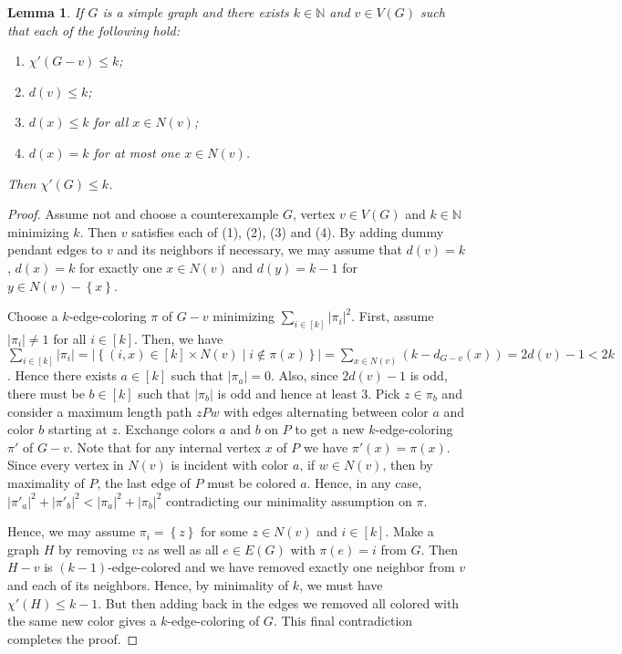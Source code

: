 \documentclass[12pt]{article}
\theoremstyle{plain}
\newtheorem{lem}[thm]{Lemma}
\theoremstyle{definition}
\theoremstyle{remark}
\newcommand{\set}[1]{\left\{ #1 \right\}}
\newcommand{\setb}[3]{\left\{ #1 \in #2 \mid #3 \right\}}
\newcommand{\card}[1]{\left|#1\right|}
\newcommand{\irange}[1]{\left[#1\right]}
\begin{document}
\begin{lem}\label{SimpleVizPrecursor}
If $G$ is a simple graph and there exists $k \in \mathbb{N}$ and $v \in V(G)$ such that each of the following hold:
\begin{enumerate}
\item $\chi'(G - v) \leq k$;
\item $d(v) \leq k$;
\item $d(x) \leq k$ for all $x \in N(v)$;
\item $d(x) = k$ for at most one $x \in N(v)$.
\end{enumerate}
Then $\chi'(G) \leq k$.
\end{lem}
\begin{proof}
Assume not and choose a counterexample $G$, vertex $v \in V(G)$ and $k \in \mathbb{N}$ minimizing $k$.  Then $v$ satisfies each of (1), (2), (3) and (4).  By adding dummy pendant edges to $v$ and its neighbors if necessary, we may assume that $d(v) = k$, $d(x) = k$ for exactly one $x \in N(v)$ and $d(y) = k - 1$ for $y \in N(v) - \set{x}$.

Choose a $k$-edge-coloring $\pi$ of $G - v$ minimizing $\sum_{i \in \irange{k}} \card{\pi_i}^2$.  First, assume $\card{\pi_i} \neq 1$ for all $i \in \irange{k}$.  Then, we have $\sum_{i \in \irange{k}} \card{\pi_i} = \card{\setb{(i, x)}{ \irange{k} \times N(v)}{i \not \in \pi(x)}} = \sum_{x \in N(v)} \left(k - d_{G-v}(x)\right) = 2d(v) - 1 < 2k$.  Hence there exists $a \in \irange{k}$ such that $\card{\pi_a} = 0$.  Also, since $2d(v) - 1$ is odd, there must be $b \in \irange{k}$ such that $\card{\pi_b}$ is odd and hence at least $3$.  Pick $z \in \pi_b$ and consider a maximum length path $zPw$ with edges alternating between color $a$ and color $b$ starting at $z$.  Exchange colors $a$ and $b$ on $P$ to get a new $k$-edge-coloring $\pi'$ of $G-v$.  Note that for any internal vertex $x$ of $P$ we have $\pi'(x) = \pi(x)$.  Since every vertex in $N(v)$ is incident with color $a$, if $w \in N(v)$, then by maximality of $P$, the last edge of $P$ must be colored $a$.  Hence, in any case, $\card{\pi'_a}^2 + \card{\pi'_b}^2 < \card{\pi_a}^2 + \card{\pi_b}^2$ contradicting our minimality assumption on $\pi$.

Hence, we may assume $\pi_i = \set{z}$ for some $z \in N(v)$ and $i \in \irange{k}$.  Make a graph $H$ by removing $vz$ as well as all $e \in E(G)$ with $\pi(e) = i$ from $G$.  Then $H-v$ is $(k-1)$-edge-colored and we have removed exactly one neighbor from $v$ and each of its neighbors.  Hence, by minimality of $k$, we must have $\chi'(H) \leq k - 1$.  But then adding back in the edges we removed all colored with the same new color gives a $k$-edge-coloring of $G$. This final contradiction completes the proof.
\end{proof}
\end{document}
